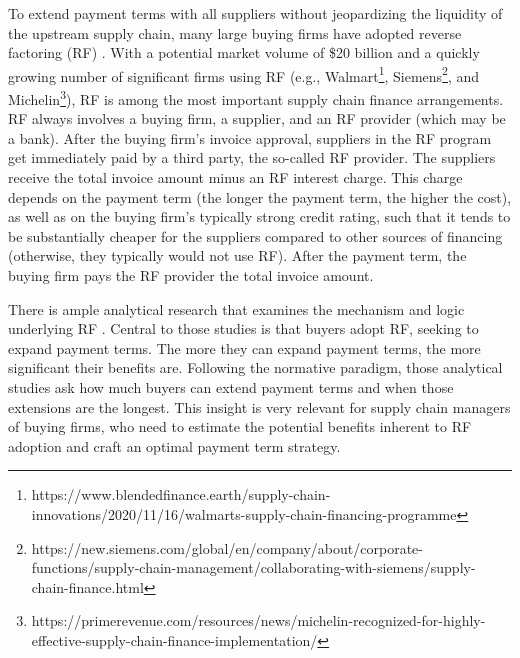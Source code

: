 \documentclass[A4,11pt]{article}
\renewcommand{\~}[1]{\tilde{#1}}
\renewcommand{\-}[1]{\overline{#1}}
\begin{document}
To extend payment terms with all suppliers without jeopardizing the liquidity of the upstream supply chain, many large buying firms have adopted reverse factoring (RF) \citep{Herath2015,vanderVliet2015, Wuttke2019}. With a potential market volume of \$20 billion \citep{Herath2015} and a quickly growing number of significant firms using RF (e.g., Walmart\footnote{https://www.blendedfinance.earth/supply-chain-innovations/2020/11/16/walmarts-supply-chain-financing-programme}, Siemens\footnote{https://new.siemens.com/global/en/company/about/corporate-functions/supply-chain-management/collaborating-with-siemens/supply-chain-finance.html}, and Michelin\footnote{https://primerevenue.com/resources/news/michelin-recognized-for-highly-effective-supply-chain-finance-implementation/}), RF is among the most important supply chain finance arrangements. RF always involves a buying firm, a supplier, and an RF provider (which may be a bank). After the buying firm's invoice approval, suppliers in the RF program get immediately paid by a third party, the so-called RF provider. The suppliers receive the total invoice amount minus an RF interest charge. This charge depends on the payment term (the longer the payment term, the higher the cost), as well as on the buying firm's typically strong credit rating, such that it tends to be substantially cheaper for the suppliers compared to other sources of financing (otherwise, they typically would not use RF). After the payment term, the buying firm pays the RF provider the total invoice amount.

There is ample analytical research that examines the mechanism and logic underlying RF \citep{Hu2018, Kouvelis2020, Lekkakos2016, Tanrisever2012,vanderVliet2015, Wuttke2016}. Central to those studies is that buyers adopt RF, seeking to expand payment terms. The more they can expand payment terms, the more significant their benefits are. Following the normative paradigm, those analytical studies ask how much buyers can extend payment terms and when those extensions are the longest. This insight is very relevant for supply chain managers of buying firms, who need to estimate the potential benefits inherent to RF adoption and craft an optimal payment term strategy. 
\end{document}
